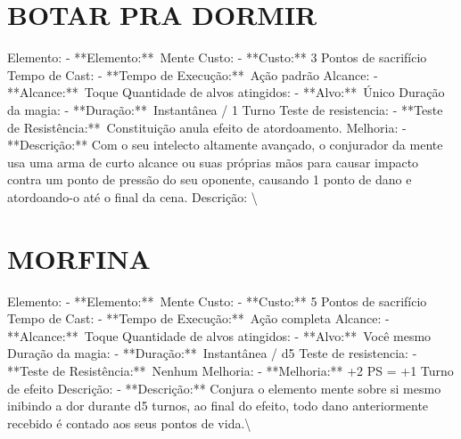 \documentclass{article}%
\begin{document}
\section{BOTAR PRA DORMIR}%
\label{sec:BOTARPRADORMIR}%
Elemento: {-} **Elemento:**~Mente\newline%
Custo: {-} **Custo:** 3 Pontos de sacrifício\newline%
Tempo de Cast: {-} **Tempo de Execução:**~Ação padrão\newline%
Alcance: {-} **Alcance:**~Toque\newline%
Quantidade de alvos atingidos: {-} **Alvo:**~Único\newline%
Duração da magia: {-} **Duração:**~Instantânea / 1 Turno\newline%
Teste de resistencia: {-} **Teste de Resistência:**~Constituição anula efeito de atordoamento.\newline%
Melhoria: {-} **Descrição:** Com o seu intelecto altamente avançado, o conjurador da mente usa uma arma de curto alcance ou suas próprias mãos para causar impacto contra um ponto de pressão do seu oponente, causando 1 ponto de dano e atordoando{-}o até o final da cena.\newline%
Descrição: \textbackslash{}

%
\section{MORFINA}%
\label{sec:MORFINA}%
Elemento: {-} **Elemento:**~Mente\newline%
Custo: {-} **Custo:** 5 Pontos de sacrifício\newline%
Tempo de Cast: {-} **Tempo de Execução:**~Ação completa\newline%
Alcance: {-} **Alcance:**~Toque\newline%
Quantidade de alvos atingidos: {-} **Alvo:**~Você mesmo\newline%
Duração da magia: {-} **Duração:**~Instantânea / d5\newline%
Teste de resistencia: {-} **Teste de Resistência:**~Nenhum\newline%
Melhoria: {-} **Melhoria:** +2 PS = +1 Turno de efeito\newline%
Descrição: {-} **Descrição:** Conjura o elemento mente sobre si mesmo inibindo a dor durante d5 turnos, ao final do efeito, todo dano anteriormente recebido é contado aos seus pontos de vida.\textbackslash{}

%
\end{document}
